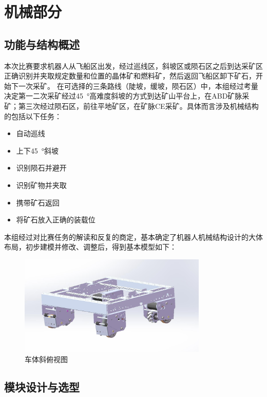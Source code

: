 \documentclass[10pt]{ctexart}
\begin{document}
\clearpage
\section{机械部分}
\subsection{功能与结构概述}

本次比赛要求机器人从飞船区出发，经过巡线区，斜坡区或陨石区之后到达采矿区正确识别并夹取规定数量和位置的晶体矿和燃料矿，然后返回飞船区卸下矿石，开始下一次采矿。
在可选择的三条路线（陡坡，缓坡，陨石区）中，本组经过考量决定第一二次采矿经过\SI{45}{\degree}高难度斜坡的方式到达矿山平台上，在ABD矿脉采矿；第三次经过陨石区，前往平地矿区，在矿脉CE采矿。具体而言涉及机械结构的包括以下任务：

\begin{itemize}
    \item 自动巡线
    \item 上下\SI{45}{\degree}斜坡
    \item 识别陨石并避开
    \item 识别矿物并夹取
    \item 携带矿石返回
    \item 将矿石放入正确的装载位
\end{itemize}

本组经过对比赛任务的解读和反复的商定，基本确定了机器人机械结构设计的大体布局，初步建模并修改、调整后，得到基本模型如下：
\begin{figure}[H]
    \centering
    \includegraphics[width = 0.8\textwidth]{machinery/carbody.jpg}
    \caption{车体斜俯视图}
    \label{fig:carbody}
\end{figure}



\subsection{模块设计与选型}
\end{document}
